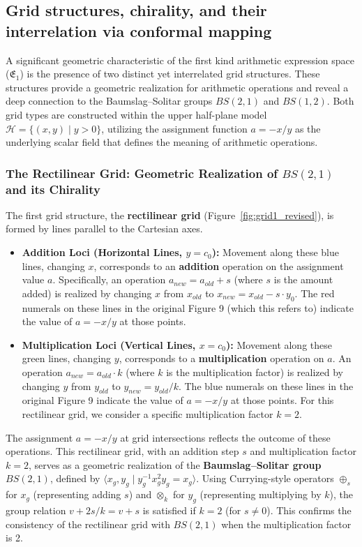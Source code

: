 \subsection{Grid structures, chirality, and their interrelation via conformal mapping}\label{subsec:grids_revised}

A significant geometric characteristic of the first kind arithmetic expression space ($\mathfrak{E}_1$) is the presence of two distinct yet interrelated grid structures. These structures provide a geometric realization for arithmetic operations and reveal a deep connection to the Baumslag--Solitar groups $BS(2,1)$ and $BS(1,2)$. Both grid types are constructed within the upper half-plane model $\mathcal{H} = \{(x,y) \mid y>0\}$, utilizing the assignment function $a = -x/y$ as the underlying scalar field that defines the meaning of arithmetic operations.

\subsubsection{The Rectilinear Grid: Geometric Realization of $BS(2,1)$ and its Chirality}

The first grid structure, the \textbf{rectilinear grid} (Figure~\ref{fig:grid1_revised}), is formed by lines parallel to the Cartesian axes. %

\begin{itemize}
    \item \textbf{Addition Loci (Horizontal Lines, $y=c_0$):} Movement along these blue lines, changing $x$, corresponds to an \textbf{addition} operation on the assignment value $a$. Specifically, an operation $a_{new} = a_{old} + s$ (where $s$ is the amount added) is realized by changing $x$ from $x_{old}$ to $x_{new} = x_{old} - s \cdot y_0$. The red numerals on these lines in the original Figure 9 (which this refers to) indicate the value of $a = -x/y$ at those points.
    \item \textbf{Multiplication Loci (Vertical Lines, $x=c_0$):} Movement along these green lines, changing $y$, corresponds to a \textbf{multiplication} operation on $a$. An operation $a_{new} = a_{old} \cdot k$ (where $k$ is the multiplication factor) is realized by changing $y$ from $y_{old}$ to $y_{new} = y_{old}/k$. The blue numerals on these lines in the original Figure 9 indicate the value of $a = -x/y$ at those points. For this rectilinear grid, we consider a specific multiplication factor $k=2$.
\end{itemize}
The assignment $a = -x/y$ at grid intersections reflects the outcome of these operations. This rectilinear grid, with an addition step $s$ and multiplication factor $k=2$, serves as a geometric realization of the \textbf{Baumslag--Solitar group $BS(2,1)$}, defined by $\langle x_g, y_g \mid y_g^{-1}x_g^2y_g = x_g \rangle$. Using Currying-style operators $\oplus_s$ for $x_g$ (representing adding $s$) and $\otimes_k$ for $y_g$ (representing multiplying by $k$), the group relation $v + 2s/k = v+s$ is satisfied if $k=2$ (for $s \neq 0$). This confirms the consistency of the rectilinear grid with $BS(2,1)$ when the multiplication factor is 2.

